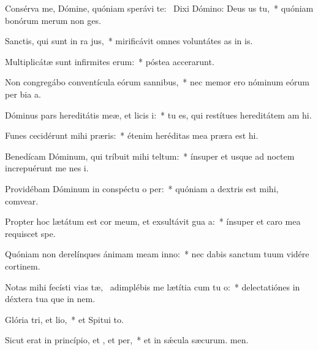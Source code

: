 \item Consérva me, Dómine, quóniam sperávi  te:~\pscross{} Dixi Dómino: Deus us  tu,~* quóniam bonórum merum non ges.
\item Sanctis, qui sunt in ra jus,~* mirificávit omnes voluntátes as in is.
\item Multiplicátæ sunt infirmites erum:~* póstea accerarunt.
\item Non congregábo conventícula eórum  sannibus,~* nec memor ero nóminum eórum per bia a.
\item Dóminus pars hereditátis meæ, et licis i:~* tu es, qui restítues hereditátem am hi.
\item Funes cecidérunt mihi  præris:~* étenim heréditas mea præra est hi.
\item Benedícam Dóminum, qui tríbuit mihi teltum:~* ínsuper et usque ad noctem increpuérunt me nes i.
\item Providébam Dóminum in conspéctu o per:~* quóniam a dextris est mihi,  comvear.
\item Propter hoc lætátum est cor meum, et exsultávit gua a:~* ínsuper et caro mea requiscet  spe.
\item Quóniam non derelínques ánimam meam  inno:~* nec dabis sanctum tuum vidére cortinem.
\item Notas mihi fecísti vias tæ,~\pscross{} adimplébis me lætítia cum tu o:~* delectatiónes in déxtera tua que in nem.
\item Glória tri, et lio,~* et Spitui to.
\item Sicut erat in princípio, et , et per,~* et in sǽcula sæcurum. men.
